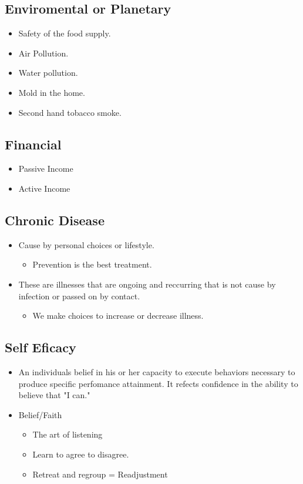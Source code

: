 \documentclass[]{article}
\begin{document}
\subsection{Enviromental or Planetary}
\begin{itemize}
	\item Safety of the food supply.
	\item Air Pollution.
	\item Water pollution.
	\item Mold in the home.
	\item Second hand tobacco smoke.
\end{itemize}

\subsection{Financial}
\begin{itemize}
	\item Passive Income
	\item Active Income
\end{itemize}

\subsection{Chronic Disease}
\begin{itemize}
	\item Cause by personal choices or lifestyle.
	\begin{itemize}
		\item Prevention is the best treatment.
	\end{itemize}
	\item These are illnesses that are ongoing and reccurring that is not cause by infection or passed on by contact. 
	\begin{itemize}
		\item We make choices to increase or decrease illness. 
	\end{itemize}
\end{itemize}

\subsection{Self Eficacy}
\begin{itemize}
	\item An individuals belief in his or her capacity to execute behaviors necessary to produce specific perfomance attainment. It refects confidence in the ability to believe that "I can." 
	\item Belief/Faith
	\begin{itemize}
		\item The art of listening 
		\item Learn to agree to disagree.
		\item Retreat and regroup = Readjustment
	\end{itemize}
\end{itemize}
\end{document}
